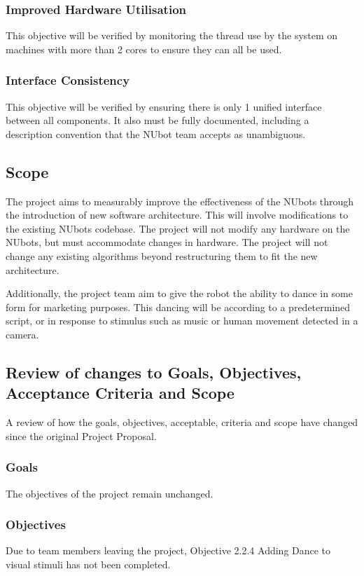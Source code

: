\documentclass[english,12pt]{scrartcl}
\begin{document}
			\subsubsection{Improved Hardware Utilisation}
				This objective will be verified by monitoring the thread use by the system on machines with more than 2 cores to ensure they can all be used.

			\subsubsection{Interface Consistency}
				This objective will be verified by ensuring there is only 1 unified interface between all components.
				It also must be fully documented, including a description convention that the NUbot team accepts as unambiguous.

		\subsection {Scope}
			The project aims to measurably improve the effectiveness of the NUbots through the introduction of new software architecture.
			This will involve modifications to the existing NUbots codebase.
			The project will not modify any hardware on the NUbots, but must accommodate changes in hardware.
			The project will not change any existing algorithms beyond restructuring them to fit the new architecture.

			Additionally, the project team aim to give the robot the ability to dance in some form for marketing purposes.
			This dancing will be according to a predetermined script, or in response to stimulus such as music or human movement detected in a camera.

		\subsection {Review of changes to Goals, Objectives, Acceptance Criteria and Scope}
			A review of how the goals, objectives, acceptable, criteria and scope have changed since the original Project Proposal.

			\subsubsection{Goals}
				The objectives of the project remain unchanged.

			\subsubsection{Objectives}
				Due to team members leaving the project, Objective 2.2.4 Adding Dance to visual stimuli has not been completed.
\end{document}
